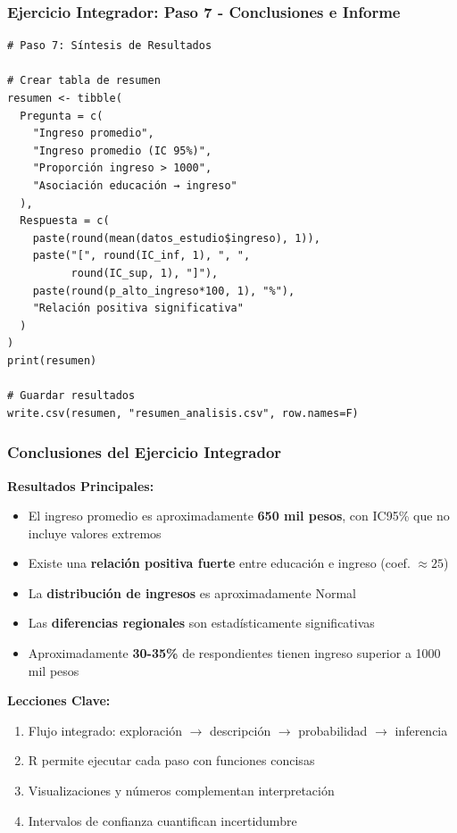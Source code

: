 \documentclass[aspectratio=169,11pt]{beamer}
\begin{document}
\begin{frame}[fragile]
\frametitle{Ejercicio Integrador: Paso 7 - Conclusiones e Informe}
\begin{lstlisting}
# Paso 7: Síntesis de Resultados

# Crear tabla de resumen
resumen <- tibble(
  Pregunta = c(
    "Ingreso promedio",
    "Ingreso promedio (IC 95%)",
    "Proporción ingreso > 1000",
    "Asociación educación → ingreso"
  ),
  Respuesta = c(
    paste(round(mean(datos_estudio$ingreso), 1)),
    paste("[", round(IC_inf, 1), ", ",
          round(IC_sup, 1), "]"),
    paste(round(p_alto_ingreso*100, 1), "%"),
    "Relación positiva significativa"
  )
)
print(resumen)

# Guardar resultados
write.csv(resumen, "resumen_analisis.csv", row.names=F)
\end{lstlisting}
\end{frame}

\begin{frame}
\frametitle{Conclusiones del Ejercicio Integrador}
\textbf{Resultados Principales:}
\begin{itemize}
  \item El ingreso promedio es aproximadamente \textbf{650 mil pesos}, con IC95\% que no incluye valores extremos
  \item Existe una \textbf{relación positiva fuerte} entre educación e ingreso (coef. $\approx 25$)
  \item La \textbf{distribución de ingresos} es aproximadamente Normal
  \item Las \textbf{diferencias regionales} son estadísticamente significativas
  \item Aproximadamente \textbf{30-35\%} de respondientes tienen ingreso superior a 1000 mil pesos
\end{itemize}

\vspace{0.3cm}
\textbf{Lecciones Clave:}
\begin{enumerate}
  \item Flujo integrado: exploración $\to$ descripción $\to$ probabilidad $\to$ inferencia
  \item R permite ejecutar cada paso con funciones concisas
  \item Visualizaciones y números complementan interpretación
  \item Intervalos de confianza cuantifican incertidumbre
\end{enumerate}
\end{frame}
\end{document}
